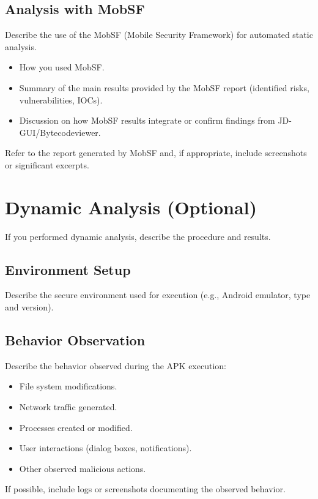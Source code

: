 \subsection{Analysis with MobSF}
\label{subsec:static_mobsf}
Describe the use of the MobSF (Mobile Security Framework) for automated static analysis.
\begin{itemize}
    \item How you used MobSF.
    \item Summary of the main results provided by the MobSF report (identified risks, vulnerabilities, IOCs).
    \item Discussion on how MobSF results integrate or confirm findings from JD-GUI/Bytecodeviewer.
\end{itemize}
Refer to the report generated by MobSF and, if appropriate, include screenshots or significant excerpts.

\newpage %
\section{Dynamic Analysis (Optional)}
\label{sec:dynamic_analysis}
If you performed dynamic analysis, describe the procedure and results.

\subsection{Environment Setup}
\label{subsec:dynamic_env}
Describe the secure environment used for execution (e.g., Android emulator, type and version).

\subsection{Behavior Observation}
\label{subsec:dynamic_behavior}
Describe the behavior observed during the APK execution:
\begin{itemize}
    \item File system modifications.
    \item Network traffic generated.
    \item Processes created or modified.
    \item User interactions (dialog boxes, notifications).
    \item Other observed malicious actions.
\end{itemize}
If possible, include logs or screenshots documenting the observed behavior.
